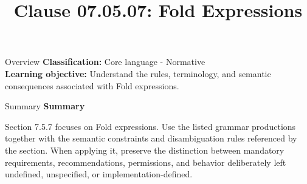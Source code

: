 \documentclass[10pt,letterpaper]{article}
\title{Clause 07.05.07: Fold Expressions}
\author{}
\date{}
\begin{document}
\maketitle
\begin{CornellOverviewBox}{Overview}
\textbf{Classification:} Core language - Normative\\[2pt]
\textbf{Learning objective:} Understand the rules, terminology, and semantic consequences associated with Fold expressions.
\end{CornellOverviewBox}\begin{CornellSummaryBox}{Summary}
{\sffamily\bfseries\color{Accent} Summary}\par\vspace{3pt}Section 7.5.7 focuses on Fold expressions. Use the listed grammar productions together with the semantic constraints and disambiguation rules referenced by the section. When applying it, preserve the distinction between mandatory requirements, recommendations, permissions, and behavior deliberately left undefined, unspecified, or implementation-defined.
\end{CornellSummaryBox}
\end{document}
